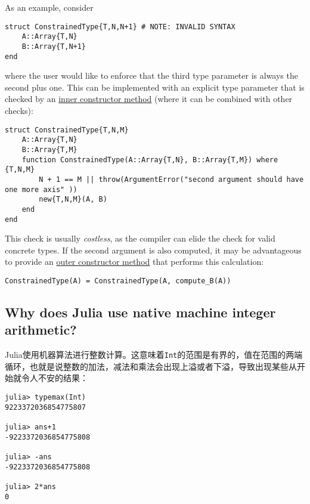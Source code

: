 As an example, consider




\begin{verbatim}
struct ConstrainedType{T,N,N+1} # NOTE: INVALID SYNTAX
    A::Array{T,N}
    B::Array{T,N+1}
end
\end{verbatim}



where the user would like to enforce that the third type parameter is always the second plus one. This can be implemented with an explicit type parameter that is checked by an \hyperlink{5052047505447273614}{inner constructor method} (where it can be combined with other checks):




\begin{verbatim}
struct ConstrainedType{T,N,M}
    A::Array{T,N}
    B::Array{T,M}
    function ConstrainedType(A::Array{T,N}, B::Array{T,M}) where {T,N,M}
        N + 1 == M || throw(ArgumentError("second argument should have one more axis" ))
        new{T,N,M}(A, B)
    end
end
\end{verbatim}



This check is usually \emph{costless}, as the compiler can elide the check for valid concrete types. If the second argument is also computed, it may be advantageous to provide an \hyperlink{1408947822788665444}{outer constructor method} that performs this calculation:




\begin{verbatim}
ConstrainedType(A) = ConstrainedType(A, compute_B(A))
\end{verbatim}



\hypertarget{3408319939041447292}{}


\subsection{Why does Julia use native machine integer arithmetic?}



Julia使用机器算法进行整数计算。这意味着\texttt{Int}的范围是有界的，值在范围的两端循环，也就是说整数的加法，减法和乘法会出现上溢或者下溢，导致出现某些从开始就令人不安的结果：




\begin{verbatim}
julia> typemax(Int)
9223372036854775807

julia> ans+1
-9223372036854775808

julia> -ans
-9223372036854775808

julia> 2*ans
0
\end{verbatim}



